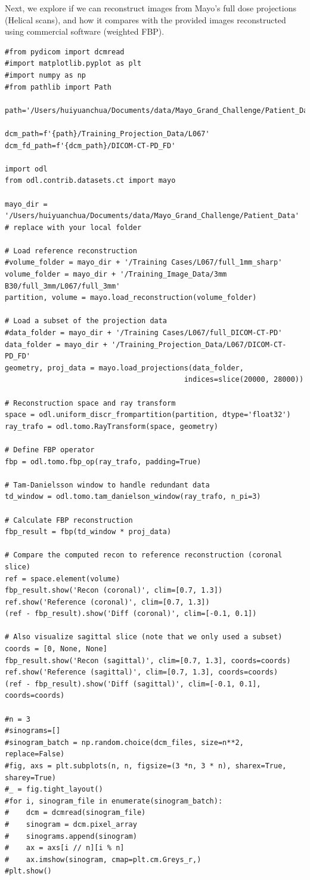 \documentclass[a4paper, 11pt]{article}
\begin{document}
Next, we explore if we can reconstruct images from Mayo's full dose projections (Helical scans), and how it compares with the provided images reconstructed using commercial software (weighted FBP).
\begin{verbatim}
#from pydicom import dcmread
#import matplotlib.pyplot as plt
#import numpy as np
#from pathlib import Path

path='/Users/huiyuanchua/Documents/data/Mayo_Grand_Challenge/Patient_Data'

dcm_path=f'{path}/Training_Projection_Data/L067'
dcm_fd_path=f'{dcm_path}/DICOM-CT-PD_FD'

import odl
from odl.contrib.datasets.ct import mayo

mayo_dir = '/Users/huiyuanchua/Documents/data/Mayo_Grand_Challenge/Patient_Data'  # replace with your local folder

# Load reference reconstruction
#volume_folder = mayo_dir + '/Training Cases/L067/full_1mm_sharp'
volume_folder = mayo_dir + '/Training_Image_Data/3mm B30/full_3mm/L067/full_3mm'
partition, volume = mayo.load_reconstruction(volume_folder)

# Load a subset of the projection data
#data_folder = mayo_dir + '/Training Cases/L067/full_DICOM-CT-PD'
data_folder = mayo_dir + '/Training_Projection_Data/L067/DICOM-CT-PD_FD'
geometry, proj_data = mayo.load_projections(data_folder,
                                          indices=slice(20000, 28000))

# Reconstruction space and ray transform
space = odl.uniform_discr_frompartition(partition, dtype='float32')
ray_trafo = odl.tomo.RayTransform(space, geometry)

# Define FBP operator
fbp = odl.tomo.fbp_op(ray_trafo, padding=True)

# Tam-Danielsson window to handle redundant data
td_window = odl.tomo.tam_danielson_window(ray_trafo, n_pi=3)

# Calculate FBP reconstruction
fbp_result = fbp(td_window * proj_data)

# Compare the computed recon to reference reconstruction (coronal slice)
ref = space.element(volume)
fbp_result.show('Recon (coronal)', clim=[0.7, 1.3])
ref.show('Reference (coronal)', clim=[0.7, 1.3])
(ref - fbp_result).show('Diff (coronal)', clim=[-0.1, 0.1])

# Also visualize sagittal slice (note that we only used a subset)
coords = [0, None, None]
fbp_result.show('Recon (sagittal)', clim=[0.7, 1.3], coords=coords)
ref.show('Reference (sagittal)', clim=[0.7, 1.3], coords=coords)
(ref - fbp_result).show('Diff (sagittal)', clim=[-0.1, 0.1], coords=coords)

#n = 3
#sinograms=[]
#sinogram_batch = np.random.choice(dcm_files, size=n**2, replace=False)
#fig, axs = plt.subplots(n, n, figsize=(3 *n, 3 * n), sharex=True, sharey=True)
#_ = fig.tight_layout()
#for i, sinogram_file in enumerate(sinogram_batch):
#    dcm = dcmread(sinogram_file)
#    sinogram = dcm.pixel_array
#    sinograms.append(sinogram)
#    ax = axs[i // n][i % n]
#    ax.imshow(sinogram, cmap=plt.cm.Greys_r,)
#plt.show()
\end{verbatim}
\end{document}
